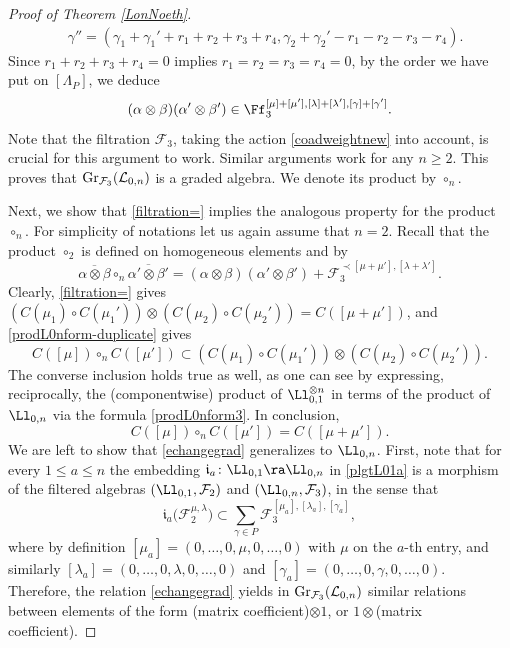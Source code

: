 \begin{proof}[Proof of Theorem \ref{LonNoeth}]
\begin{align*}
& \gamma'' = (\gamma_1+\gamma_1'+r_1+r_2+r_3+r_4,\gamma_2+\gamma_2'-r_1-r_2-r_3-r_4).
\end{align*}
Since $r_1+r_2+r_3+r_4=0$ implies $r_1=r_2=r_3=r_4=0$, by the order we have put on $[\Lambda_P]$, we deduce
 \[(\alpha\otimes \beta)(\alpha'\otimes \beta') \in \Ff_3^{[\mu]+[\mu'],[\lambda]+[\lambda'],[\gamma]+[\gamma']}.\]
Note that the filtration $\mathcal{F}_3$, taking the action \eqref{coadweightnew} into account, is crucial for this argument to work. Similar arguments work for any $n\geq 2$. This proves that ${\rm Gr}_{{\mathcal F}_3}({\mathcal L}_{0,n})$ is a graded algebra. We denote its product by $\circ_n$.

Next, we show that \eqref{filtration=} implies the analogous property for the product $\circ_n$. For simplicity of notations let us again assume that $n=2$. Recall that the product $\circ_2$ is defined on homogeneous elements  and  by \[\overline{\alpha\otimes \beta}\circ_n\overline{\alpha'\otimes \beta'} = (\alpha\otimes \beta)(\alpha'\otimes \beta') + {\mathcal F}_3^{\prec [\mu+\mu'],[\lambda+\lambda']}.\]
Clearly, \eqref{filtration=} gives $(C(\mu_1)\circ C(\mu_1'))\otimes (C(\mu_2)\circ C(\mu_2')) = C([\mu + \mu'])$, and \eqref{prodL0nform-duplicate} gives
 \[C([\mu]) \circ_n C([\mu']) \subset (C(\mu_1)\circ C(\mu_1'))\otimes (C(\mu_2)\circ C(\mu_2')).\]
The converse inclusion holds true as well, as one can see by expressing, reciprocally, the (componentwise) product of $\Ll_{0,1}^{\otimes n}$ in terms of the product of $\Ll_{0,n}$ via the formula \eqref{prodL0nform3}. In conclusion,%
\[%
C([\mu]) \circ_n C([\mu']) = C([\mu + \mu']).
\]
We are left to show that \eqref{echangegrad} generalizes to $\Ll_{0,n}$. First, note that for every $1\leq a\leq n$ the embedding $\mathfrak{i}_a\colon \Ll_{0,1}\ra \Ll_{0,n}$ in \eqref{plgtL01a} is a morphism of the filtered algebras $(\Ll_{0,1},\mathcal{F}_2)$ and $(\Ll_{0,n},\mathcal{F}_3)$, in the sense that
\[\mathfrak{i}_a\big({\mathcal F}_2^{\mu,\lambda}\big) \subset \sum_{\gamma \in P} {\mathcal F}_3^{[\mu_a],[\lambda_a],[\gamma_a]},
\]
where by definition $[\mu_a] = (0,\dots,0,\mu,0,\dots,0)$ with $\mu$ on the $a$-th entry, and similarly $[\lambda_a] = (0,\dots,0,\lambda,0,\dots,0)$ and $[\gamma_a] = (0,\dots,0,\gamma,0,\dots,0)$. Therefore, the relation \eqref{echangegrad} yields in ${\rm Gr}_{{\mathcal F}_3}({\mathcal L}_{0,n})$ similar relations between elements of the form (matrix coefficient)$\otimes 1$, or $1 \otimes$(matrix coefficient).


\end{proof}
